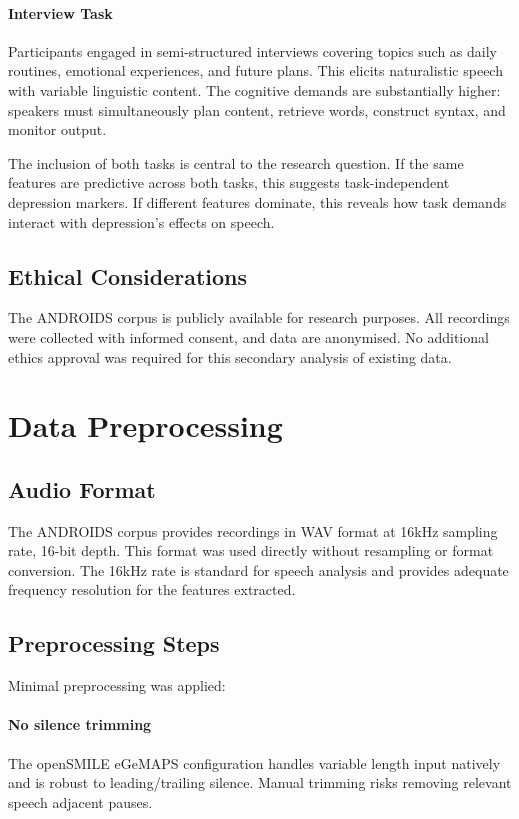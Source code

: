 \paragraph{Interview Task} Participants engaged in semi-structured interviews covering topics such as daily routines, emotional experiences, and future plans. This elicits naturalistic speech with variable linguistic content. The cognitive demands are substantially higher: speakers must simultaneously plan content, retrieve words, construct syntax, and monitor output.

The inclusion of both tasks is central to the research question. If the same features are predictive across both tasks, this suggests task-independent depression markers. If different features dominate, this reveals how task demands interact with depression's effects on speech.

\subsection{Ethical Considerations}

The ANDROIDS corpus is publicly available for research purposes. All recordings were collected with informed consent, and data are anonymised. No additional ethics approval was required for this secondary analysis of existing data.

\section{Data Preprocessing}

\subsection{Audio Format}

The ANDROIDS corpus provides recordings in WAV format at 16kHz sampling rate, 16-bit depth. This format was used directly without resampling or format conversion. The 16kHz rate is standard for speech analysis and provides adequate frequency resolution for the features extracted.

\subsection{Preprocessing Steps}

Minimal preprocessing was applied:

\paragraph{No silence trimming} The openSMILE eGeMAPS configuration handles variable length input natively and is robust to leading/trailing silence. Manual trimming risks removing relevant speech adjacent pauses.

